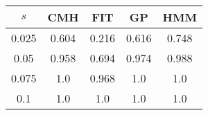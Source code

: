 \centering \begin{tabular}{c|c|c|c|c}
$s$	&CMH	&FIT	&GP	&HMM\\\hline
0.025	&0.604	&0.216	&0.616	&0.748\\
0.05	&0.958	&0.694	&0.974	&0.988\\
0.075	&1.0	&0.968	&1.0	&1.0\\
0.1	&1.0	&1.0	&1.0	&1.0\\
\end{tabular}
